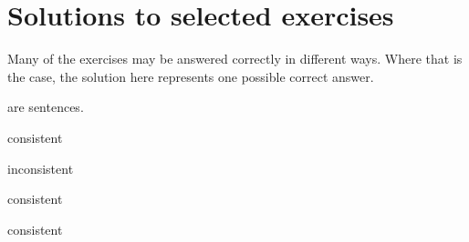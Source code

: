 \chapter[Solutions to selected exercises]{Solutions to selected exercises}
\label{app.solutions}

Many of the exercises may be answered correctly in different ways. Where that is the case, the solution here represents one possible correct answer.

\nextSeq
\nextSeq
\noSeq
\nextSeq
\nextSeq
\nextSeq
\noSeq
\nextSeq
\noSeq
\lastSeq are sentences.


\begin{earg}
\item consistent
\item inconsistent
\item consistent
\item consistent
\end{earg}

